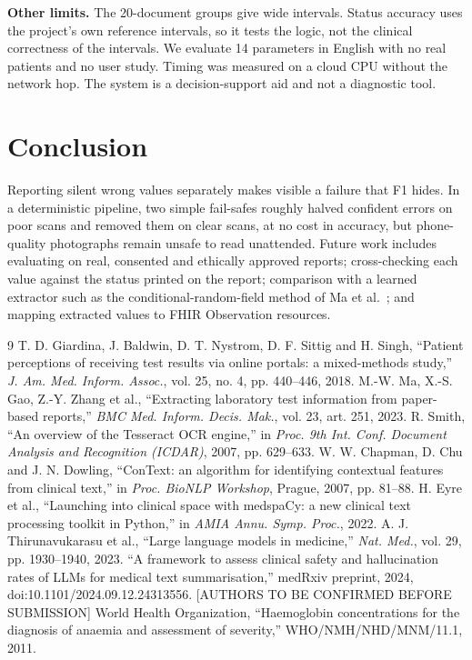 \documentclass[10pt,twocolumn]{article}
\begin{document}
\textbf{Other limits.} The 20-document groups give wide intervals. Status accuracy uses the project's own reference intervals, so it tests the logic, not the clinical correctness of the intervals. We evaluate 14 parameters in English with no real patients and no user study. Timing was measured on a cloud CPU without the network hop. The system is a decision-support aid and not a diagnostic tool.

\section{Conclusion}
Reporting silent wrong values separately makes visible a failure that F1 hides. In a deterministic pipeline, two simple fail-safes roughly halved confident errors on poor scans and removed them on clear scans, at no cost in accuracy, but phone-quality photographs remain unsafe to read unattended. Future work includes evaluating on real, consented and ethically approved reports; cross-checking each value against the status printed on the report; comparison with a learned extractor such as the conditional-random-field method of Ma et al.\ \cite{ma}; and mapping extracted values to FHIR Observation resources.

\begin{thebibliography}{9}\small
{} T. D. Giardina, J. Baldwin, D. T. Nystrom, D. F. Sittig and H. Singh, ``Patient perceptions of receiving test results via online portals: a mixed-methods study,'' \emph{J. Am. Med. Inform. Assoc.}, vol. 25, no. 4, pp. 440--446, 2018.
 M.-W. Ma, X.-S. Gao, Z.-Y. Zhang et al., ``Extracting laboratory test information from paper-based reports,'' \emph{BMC Med. Inform. Decis. Mak.}, vol. 23, art. 251, 2023.
 R. Smith, ``An overview of the Tesseract OCR engine,'' in \emph{Proc. 9th Int. Conf. Document Analysis and Recognition (ICDAR)}, 2007, pp. 629--633.
 W. W. Chapman, D. Chu and J. N. Dowling, ``ConText: an algorithm for identifying contextual features from clinical text,'' in \emph{Proc. BioNLP Workshop}, Prague, 2007, pp. 81--88.
 H. Eyre et al., ``Launching into clinical space with medspaCy: a new clinical text processing toolkit in Python,'' in \emph{AMIA Annu. Symp. Proc.}, 2022.
 A. J. Thirunavukarasu et al., ``Large language models in medicine,'' \emph{Nat. Med.}, vol. 29, pp. 1930--1940, 2023.
 ``A framework to assess clinical safety and hallucination rates of LLMs for medical text summarisation,'' medRxiv preprint, 2024, doi:10.1101/2024.09.12.24313556. [AUTHORS TO BE CONFIRMED BEFORE SUBMISSION]
 World Health Organization, ``Haemoglobin concentrations for the diagnosis of anaemia and assessment of severity,'' WHO/NMH/NHD/MNM/11.1, 2011.
\end{thebibliography}
\end{document}
